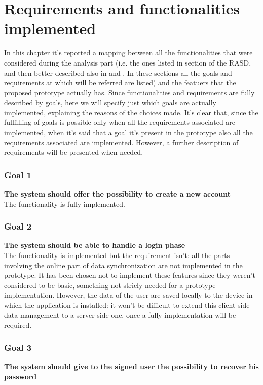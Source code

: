 \chapter{Requirements and functionalities implemented} \label{chap:reqAndFuct}

In this chapter it's reported a mapping between all the functionalities that were considered during the analysis part (i.e. the ones listed in section  of the RASD, and then better described also in  and . In these sections all the goals and requirements at which will be referred are listed) and the featuers that the proposed prototype actually has. Since functionalities and requirements are fully described by goals, here we will specify just which goals are actually implemented, explaining the reasons of the choices made.
It's clear that, since the fullfilling of goals is possible only when all the requirements associated are implemented, when it's said that a goal it's present in the prototype also all the requirements associated are implemented.
However, a further description of requirements will be presented when needed.

\subsection{Goal 1} \label{subsect:gNewAccount}
\textbf{The system should offer the possibility to create a new account}\\

The functionality is fully implemented.

\subsection{Goal 2} \label{subsect:gLoginPhase}
\textbf{The system should be able to handle a login phase}\\

The functionality is implemented but the requirement  isn't: all the parts involving the online part of data synchronization are not implemented in the prototype. It has been chosen not to implement these features since they weren't considered to be basic, something not stricly needed for a prototype implementation. However, the data of the user are saved locally to the device in which the application is installed: it won't be difficult to extend this client-side data management to a server-side one, once a fully implementation will be required.

\subsection{Goal 3} \label{subsect:gPasswordRecovery}
\textbf{The system should give to the signed user the possibility to recover his password} \\

